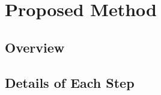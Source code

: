 \chapter{Proposed Method}
\label{chap:method}

\section{Overview}
\label{sec:overview}

\section{Details of Each Step}
\label{sec:procedure}
